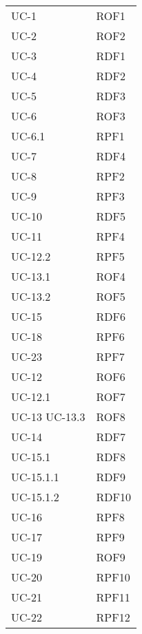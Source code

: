 \begin{longtable}{| p{5cm} | p{5cm} |}
		
		
		UC-1 & ROF1 \\
		\rowcolor{LightGray}
		UC-2 & ROF2 \\
		UC-3 & RDF1 \\
		\rowcolor{LightGray}
		UC-4 & RDF2 \\
		UC-5 & RDF3 \\
		\rowcolor{LightGray}
		UC-6 & ROF3 \\
		UC-6.1 & RPF1 \\
		\rowcolor{LightGray}
		UC-7 & RDF4 \\
		UC-8 & RPF2 \\
		\rowcolor{LightGray}
		UC-9 & RPF3 \\
		UC-10 & RDF5 \\
		\rowcolor{LightGray}
		UC-11 & RPF4 \\
		UC-12.2 & RPF5 \\
		\rowcolor{LightGray}
		UC-13.1 & ROF4 \\
		UC-13.2 & ROF5 \\
		\rowcolor{LightGray}
		UC-15 & RDF6 \\
		UC-18 & RPF6 \\
		\rowcolor{LightGray}
		UC-23 & RPF7 \\
		UC-12 & ROF6 \\
		\rowcolor{LightGray}
		UC-12.1 &ROF7 \\
		UC-13 \newline UC-13.3 & ROF8 \\
		\rowcolor{LightGray}
		UC-14 & RDF7 \\
		UC-15.1 & RDF8 \\
		\rowcolor{LightGray}
		UC-15.1.1 & RDF9 \\
		UC-15.1.2 & RDF10\\
		\rowcolor{LightGray}
		UC-16 & RPF8 \\
		UC-17 & RPF9 \\
		\rowcolor{LightGray}
		UC-19 & ROF9 \\
		UC-20 & RPF10 \\
		\rowcolor{LightGray}
		UC-21 & RPF11 \\
		UC-22 & RPF12 \\ 
		\hline
\end{longtable}


